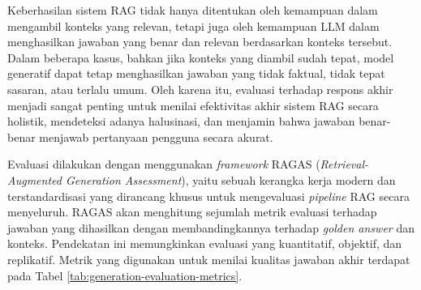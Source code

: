 Keberhasilan sistem RAG tidak hanya ditentukan oleh kemampuan dalam mengambil konteks yang relevan, tetapi juga oleh kemampuan LLM dalam menghasilkan jawaban yang benar dan relevan berdasarkan konteks tersebut.
Dalam beberapa kasus, bahkan jika konteks yang diambil sudah tepat, model generatif dapat tetap menghasilkan jawaban yang tidak faktual, tidak tepat sasaran, atau terlalu umum.
Oleh karena itu, evaluasi terhadap respons akhir menjadi sangat penting untuk menilai efektivitas akhir sistem RAG secara holistik, mendeteksi adanya halusinasi, dan menjamin bahwa jawaban benar-benar menjawab pertanyaan pengguna secara akurat.

\vspace{1cm}
Evaluasi dilakukan dengan menggunakan \textit{framework} RAGAS (\textit{Retrieval-Augmented Generation Assessment}), yaitu sebuah kerangka kerja modern dan terstandardisasi yang dirancang khusus untuk mengevaluasi \textit{pipeline} RAG secara menyeluruh.
RAGAS akan menghitung sejumlah metrik evaluasi terhadap jawaban yang dihasilkan dengan membandingkannya terhadap \textit{golden answer} dan konteks. Pendekatan ini memungkinkan evaluasi yang kuantitatif, objektif, dan replikatif.
Metrik yang digunakan untuk menilai kualitas jawaban akhir terdapat pada Tabel \ref{tab:generation-evaluation-metrics}.

